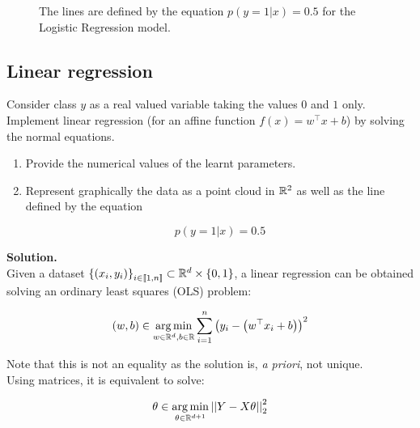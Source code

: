 \documentclass[a4paper, 11pt]{article}
\begin{document}
\begin{enumerate}[label=\alph*]
\begin{figure}[!htb]
          \label{fig:logreg_c}
        \endminipage
        \caption{The lines are defined by the equation $p(y=1|x)=0.5$ for the Logistic Regression model.}
        \label{fig:log-reg-plot}
        \end{figure}
\end{enumerate}

\subsection{Linear regression}

Consider class $y$ as a real valued variable taking the values $0$ and $1$ only. Implement linear regression (for an affine function $f(x) = w^\top x + b$) by solving the normal equations.

\begin{enumerate}[label=\alph*]
    \item Provide the numerical values of the learnt parameters.
    
    \item Represent graphically the data as a point cloud in $\mathbb{R}^{2}$ as well as the line defined by the equation
    
    \begin{equation*}
        p \left( y = 1 | x \right) = 0.5
    \end{equation*}
\end{enumerate}

\textbf{Solution.} \\

Given a dataset $\left\{ \left( x_{i}, y_{i} \right) \right\}_{i \in [\![ 1, n ]\!]} \subset \mathbb{R}^{d} \times \left\{ 0, 1 \right\}$, a linear regression can be obtained solving an ordinary least squares (OLS) problem:
    
\begin{equation*}
\left( w, b \right) \in \underset{w \in \mathbb{R}^{d}, b \in \mathbb{R}}{\arg\min} \sum_{i=1}^{n} \left( y_{i} - \left( w^\top x_{i} + b \right) \right)^{2}    
\end{equation*}

Note that this is not an equality as the solution is, \textit{a priori}, not unique. \\

Using matrices, it is equivalent to solve:
    
\begin{equation*}
    \theta \in \underset{\theta \in \mathbb{R}^{d+1}}{\arg\min} \left|\left| Y - X \theta \right|\right|_{2}^{2}
\end{equation*}
    
\end{document}
